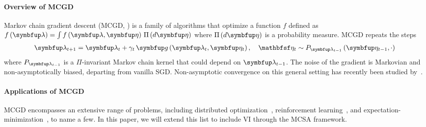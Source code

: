 \paragraph{\textbf{Overview of MCGD}}
Markov chain gradient descent (MCGD, \citealt{duchi_ergodic_2012, NEURIPS2018_1371bcce}) is a family of algorithms that optimize a function \(f\) defined as \(f\left(\vlambda\right) = \int f\left(\vlambda, \veta\right) \, \Pi\left(d\veta\right)\) where \(\Pi\left(d\veta\right)\) is a probability measure.
MCGD repeats the steps 
{%
\begin{align}
  \vlambda_{t+1}    = \vlambda_{t} + \gamma_t \, \vg\left(\vlambda_t, \veta_{t}\right),\quad 
  \rvveta_{t}  \sim P_{\vlambda_{t-1}}\left( \veta_{t-1}, \cdot \right)\label{eq:mcgd}
\end{align}
}%
where \(P_{\vlambda_{t-1}}\) is a \(\Pi\)-invariant Markov chain kernel that could depend on \(\vlambda_{t-1}\).
The noise of the gradient is Markovian and non-asymptotically biased, departing from vanilla SGD.
Non-asymptotic convergence on this general setting has recently been studied by~\citet{duchi_ergodic_2012, NEURIPS2018_1371bcce, pmlr-v99-karimi19a, doan_finitetime_2020, doan_convergence_2020, debavelaere_convergence_2021}.

\vspace{-0.1in}
\paragraph{\textbf{Applications of MCGD}}
MCGD encompasses an extensive range of problems, including distributed optimization~\citep{ram_incremental_2009}, reinforcement learning~\citep{tadic_asymptotic_2017, doan_convergence_2020, Xiong_Xu_Liang_Zhang_2021}, and expectation-minimization~\citep{pmlr-v99-karimi19a}, to name a few.
In this paper, we will extend this list to include VI through the MCSA framework.

